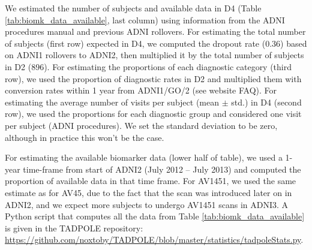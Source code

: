 We estimated the number of subjects and available data in D4 (Table \ref{tab:biomk_data_available}, last column) using information from the ADNI procedures manual and previous ADNI rollovers. For estimating the total number of subjects (first row) expected in D4, we computed the dropout rate (0.36) based on ADNI1 rollovers to ADNI2, then multiplied it by the total number of subjects in D2 (896). For estimating the proportions of each diagnostic category (third row), we used the proportion of diagnostic rates in D2 and multiplied them with conversion rates within 1 year from ADNI1/GO/2 (see website FAQ). For estimating the average number of visits per subject (mean $\pm$ std.) in D4 (second row), we used the proportions for each diagnostic group and considered one visit per subject (ADNI procedures). We set the standard deviation to be zero, although in practice this won't be the case. 

For estimating the available biomarker data (lower half of table), we used a 1-year time-frame from start of ADNI2 (July 2012 -- July 2013) and computed the proportion of available data in that time frame. For AV1451, we used the same estimate as for AV45, due to the fact that the scan was introduced later on in ADNI2, and we expect more subjects to undergo AV1451 scans in ADNI3. A Python script that computes all the data from Table \ref{tab:biomk_data_available} is given in the TADPOLE repository: \url{https://github.com/noxtoby/TADPOLE/blob/master/statistics/tadpoleStats.py}.
